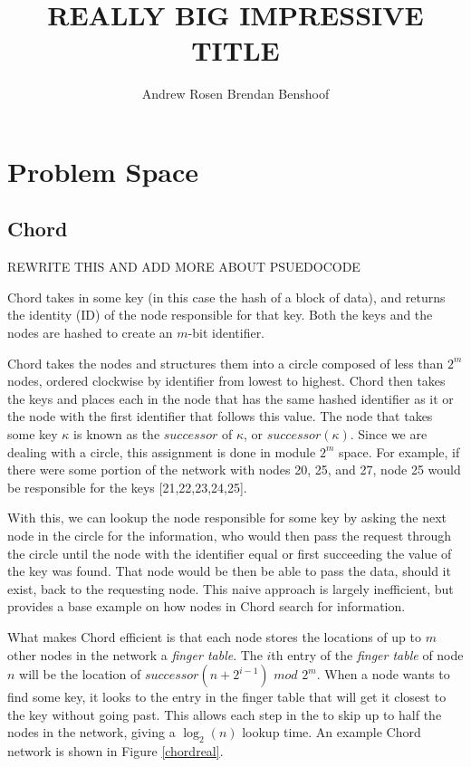 \documentclass[12pt]{article} %
\title{REALLY BIG IMPRESSIVE TITLE}
\author{Andrew Rosen \qquad Brendan Benshoof }
\date{} %
\begin{document}
\maketitle

\section{Problem Space}


\subsection{Chord}

REWRITE THIS AND ADD MORE ABOUT PSUEDOCODE 

Chord \cite{Chord} takes in some key (in this case the hash of a block of data), and returns the identity (ID) of the node responsible for that key.  Both the keys and the nodes are hashed to create an $m$-bit identifier.

Chord takes the nodes and structures them into a circle composed of less than $2^m$ nodes, ordered clockwise by identifier from lowest to highest.  Chord then takes the keys and places each in the node that has the same hashed identifier as it or the node with the first identifier that follows this value.  The node that takes some key $\kappa$ is known as the $successor$ of $\kappa$, or $successor(\kappa)$.  Since we are dealing with a circle, this assignment is done in module $2^m$ space.  For example, if there were some portion of the network with nodes 20, 25, and 27, node 25 would be responsible for the keys [21,22,23,24,25].


With this, we can lookup the node responsible for some key by asking the next node in the circle for the information, who would then pass the request through the circle until the node with the identifier equal or first succeeding the value of the key was found.  That node would be then be able to pass the data, should it exist, back to the requesting node.  This naive approach is largely inefficient, but provides a base example on how nodes in Chord search for information.

What makes Chord efficient is that each node stores the locations of up to $m$ other nodes in the network a \emph{finger table}.  The $i$th entry of the \emph{finger table} of  node $n$ will be the location of $successor(n+2^{i-1})$ $mod$ $2^m$. When a node wants to find some key, it looks to the entry in the finger table that will get it closest to the key without going past.  This allows each step in the to skip up to half the nodes in the network, giving a $\log_2(n)$ lookup time. An example Chord network is shown in Figure \ref{chordreal}.
\end{document}
